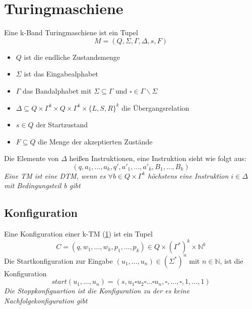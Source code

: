 \documentclass[DIV=15]{scrartcl}
\begin{document}
\section{Turingmaschiene}
    \label{sec:Turingmaschiene}
    Eine k-Band Turingmaschiene ist ein Tupel \[M=(Q,\Sigma,\Gamma,\Delta,s,F)\]
    \begin{itemize}
        \item \(Q\) ist die endliche Zustandsmenge
        \item \(\Sigma\) ist das Eingabealphabet
        \item \(\Gamma\) das Bandalphabet mit \(\Sigma\subseteq\Gamma\) und \(\square\in\Gamma\backslash\Sigma\)
        \item \(\Delta\subseteq Q\times\Gamma^k\times Q\times\Gamma^k\times {\{L,S,R\}}^k\) die Übergangsrelation
        \item \(s\in Q\) der Startzustand
        \item \(F\subseteq Q\) die Menge der akzeptierten Zustände
    \end{itemize}
    Die Elemente von \(\Delta\) heißen Instruktionen, eine Instruktion sieht wie folgt aus:
    \[(q,a_1,\dots,a_k,q',a'_1,\dots,a'_k,B_1,\dots,B_k)\]
    \textit{Eine TM ist eine DTM, wenn es \(\forall b\in Q\times\Gamma^k\) höchstens eine Instruktion \(i\in \Delta\) mit Bedingungsteil b gibt}
\subsection{Konfiguration}
    Eine Konfiguration einer k-TM (\ref{sec:Turingmaschiene}) ist ein Tupel 
    \[C=(q,w_1,\dots,w_k,p_1,\dots,p_k)\in Q \times (\Gamma^*)^k \times \mathbb{N}^k\]
    Die Startkonfiguration zur Eingabe \((u_1,\dots,u_n)\in(\Sigma^*)^n\) mit \(n\in\mathbb{N}\), ist die Konfiguration
    \[start(u_1,\dots,u_n)=(s,u_1\square u_2\square\dots\square u_n,\square,\dots,\square,1,\dots,1)\]
    \textit{Die Stoppkonfiguartion ist die Konfiguration zu der es keine Nachfolgekonfiguration gibt}
\end{document}
